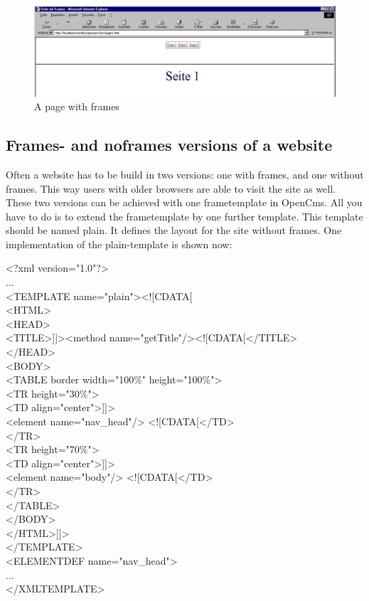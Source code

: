 \begin{figure}[hbt]
\begin{center}
\includegraphics[width=\sgw]
                   {pics/templateMech/frames_kurz}
\caption[A page with frames]
           {A page with frames}
\label{frames1}
\end{center}
\end{figure}

\subsection{Frames- and noframes versions of a website}

Often a website has to be build in two versions: one with frames,
and one without frames. This way users with older browsers are
able to visit the site as well. These two versions can be achieved
with one frametemplate in OpenCms. All you have to do is to extend
the frametemplate by one further template. This template should
be named {\name plain}. It defines the layout for the site without
frames. One implementation of the {\name plain}-template is shown now:

\begin{xml}
<?xml version="1.0"?>\\
...\\
<TEMPLATE name="plain"><![CDATA[\\
<HTML> \\
<HEAD>\\
\xtaba <TITLE>]]><method name="getTitle"/><![CDATA[</TITLE>\\
</HEAD>\\
<BODY>\\
\xtaba <TABLE border width="100\%" height="100\%">\\
\xtaba   <TR height="30\%">\\
\xtabb             <TD align="center">]]> \\
\xtabb              <element name="nav\_head"/> <![CDATA[</TD>\\
\xtaba   </TR>\\
\xtaba   <TR height="70\%">\\
\xtabb             <TD align="center">]]>\\
\xtabb              <element name="body"/> <![CDATA[</TD>\\
\xtaba   </TR>\\
\xtaba </TABLE>\\
</BODY>\\
</HTML>]]>\\
</TEMPLATE>\\

<ELEMENTDEF name="nav\_head">\\
...\\
</XMLTEMPLATE>\\
\end{xml}


